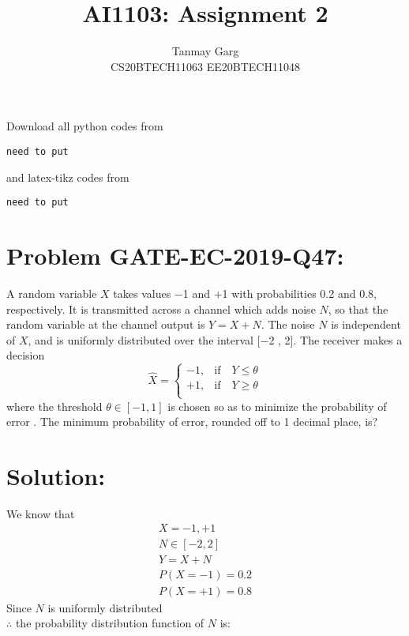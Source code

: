 \documentclass[journal,12pt,twocolumn]{IEEEtran}
\begin{document}
     \def\rightbox#1{\makebox[0in][r]{#1}}
     \def\centbox#1{\makebox[0in]{#1}}
     \def\topbox#1{\raisebox{-\baselineskip}[0in][0in]{#1}}
     \def\midbox#1{\raisebox{-0.5\baselineskip}[0in][0in]{#1}}
\vspace{3cm}
\title{AI1103: Assignment 2}
\author{Tanmay Garg \\CS20BTECH11063 EE20BTECH11048}
\maketitle
\newpage
\bigskip
\renewcommand{\thefigure}{\theenumi}
\renewcommand{\thetable}{\theenumi}
Download all python codes from 
\begin{lstlisting}
need to put
\end{lstlisting}
%
and latex-tikz codes from 
%
\begin{lstlisting}
need to put
\end{lstlisting}

\section*{Problem GATE-EC-2019-Q47: }
A random variable $X$ takes values −1 and +1 with probabilities 0.2 and 0.8, respectively.
It is transmitted across a channel which adds noise $N$, so that the random variable at the
channel output is $Y = X + N$. The noise $N$ is independent of $X$, and is uniformly
distributed over the interval [−2 , 2]. The receiver makes a decision
\[
\hat{X} = \begin{cases}
            -1, &\text{if}\quad Y \leq \theta \\
             +1, &\text{if}\quad Y \geq \theta\\
            \end{cases}
\]
where the threshold $\theta  \in [−1,1]$ is chosen so as to minimize the probability of error
. The minimum probability of error, rounded off to 1 decimal place, is?
\section*{Solution:}
We know that 
\begin{align}
    X = {-1,+1}\\
    N \in [-2,2]\\
    Y = X + N\\
    P(X = -1) = 0.2\\
    P(X = +1) = 0.8
\end{align}
Since $N$ is uniformly distributed\\
$\therefore$ the probability distribution function of $N$ is:
\end{document}
